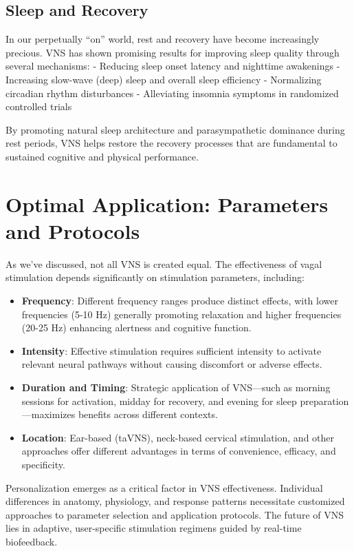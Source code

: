 \documentclass[
  Letterpaper,
]{scrbook}
\providecommand{\tightlist}{%
  \setlength{\itemsep}{0pt}\setlength{\parskip}{0pt}}\usepackage{longtable,booktabs,array}
\begin{document}
\subsection{Sleep and Recovery}\label{sleep-and-recovery}

In our perpetually ``on'' world, rest and recovery have become
increasingly precious. VNS has shown promising results for improving
sleep quality through several mechanisms: - Reducing sleep onset latency
and nighttime awakenings - Increasing slow-wave (deep) sleep and overall
sleep efficiency - Normalizing circadian rhythm disturbances -
Alleviating insomnia symptoms in randomized controlled trials

By promoting natural sleep architecture and parasympathetic dominance
during rest periods, VNS helps restore the recovery processes that are
fundamental to sustained cognitive and physical performance.

\section{Optimal Application: Parameters and
Protocols}\label{optimal-application-parameters-and-protocols}

As we've discussed, not all VNS is created equal. The effectiveness of
vagal stimulation depends significantly on stimulation parameters,
including:

\begin{itemize}
\tightlist
\item
  \textbf{Frequency}: Different frequency ranges produce distinct
  effects, with lower frequencies (5-10 Hz) generally promoting
  relaxation and higher frequencies (20-25 Hz) enhancing alertness and
  cognitive function.
\item
  \textbf{Intensity}: Effective stimulation requires sufficient
  intensity to activate relevant neural pathways without causing
  discomfort or adverse effects.
\item
  \textbf{Duration and Timing}: Strategic application of VNS---such as
  morning sessions for activation, midday for recovery, and evening for
  sleep preparation---maximizes benefits across different contexts.
\item
  \textbf{Location}: Ear-based (taVNS), neck-based cervical stimulation,
  and other approaches offer different advantages in terms of
  convenience, efficacy, and specificity.
\end{itemize}

Personalization emerges as a critical factor in VNS effectiveness.
Individual differences in anatomy, physiology, and response patterns
necessitate customized approaches to parameter selection and application
protocols. The future of VNS lies in adaptive, user-specific stimulation
regimens guided by real-time biofeedback.
\end{document}
